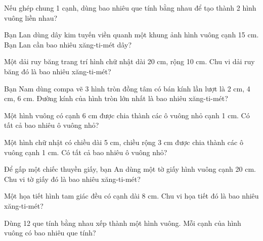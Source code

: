 \begin{ex}
Nếu ghép chung 1 cạnh, dùng bao nhiêu que tính bằng nhau để tạo thành 2 hình vuông liền nhau?
\end{ex}

\begin{ex}
Bạn Lan dùng dây kim tuyến viền quanh một khung ảnh hình vuông cạnh 15 cm. Bạn Lan cần bao nhiêu xăng-ti-mét dây?
\end{ex}

\begin{ex}
Một dải ruy băng trang trí hình chữ nhật dài 20 cm, rộng 10 cm. Chu vi dải ruy băng đó là bao nhiêu xăng-ti-mét?
\end{ex}

\begin{ex}
Bạn Nam dùng compa vẽ 3 hình tròn đồng tâm có bán kính lần lượt là 2 cm, 4 cm, 6 cm. Đường kính của hình tròn lớn nhất là bao nhiêu xăng-ti-mét?
\end{ex}

\begin{ex}
Một hình vuông có cạnh 6 cm được chia thành các ô vuông nhỏ cạnh 1 cm. Có tất cả bao nhiêu ô vuông nhỏ?
\end{ex}

\begin{ex}
Một hình chữ nhật có chiều dài 5 cm, chiều rộng 3 cm được chia thành các ô vuông cạnh 1 cm. Có tất cả bao nhiêu ô vuông nhỏ?
\end{ex}

\begin{ex}
Để gấp một chiếc thuyền giấy, bạn An dùng một tờ giấy hình vuông cạnh 20 cm. Chu vi tờ giấy đó là bao nhiêu xăng-ti-mét?
\end{ex}

\begin{ex}
Một họa tiết hình tam giác đều có cạnh dài 8 cm. Chu vi họa tiết đó là bao nhiêu xăng-ti-mét?
\end{ex}

\begin{ex}
Dùng 12 que tính bằng nhau xếp thành một hình vuông. Mỗi cạnh của hình vuông có bao nhiêu que tính?
\end{ex}

